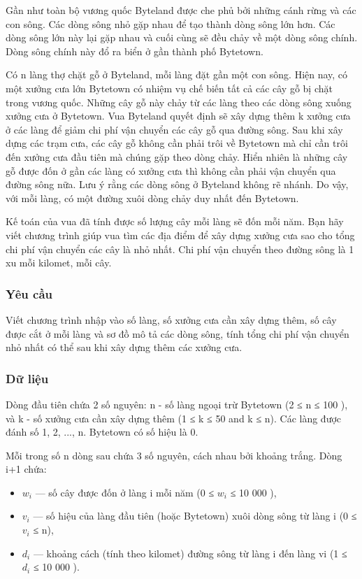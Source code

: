 



   Gần như toàn bộ vương quốc Byteland được che phủ bởi những cánh rừng và các con sông. Các dòng sông nhỏ gặp nhau để tạo thành dòng sông lớn hơn. Các dòng sông lớn này lại gặp nhau và cuối cùng sẽ đều chảy về một dòng sông chính. Dòng sông chính này đổ ra biển ở gần thành phố Bytetown.  

   Có n làng thợ chặt gỗ ở Byteland, mỗi làng đặt gần một con sông. Hiện nay, có một xưởng cưa lớn Bytetown có nhiệm vụ chế biến tất cả các cây gỗ bị chặt trong vương quốc. Những cây gỗ này chảy từ các làng theo các dòng sông xuống xưởng cưa ở Bytetown. Vua Byteland quyết định sẽ xây dựng thêm k xưởng cưa ở các làng để giảm chi phí vận chuyển các cây gỗ qua đường sông. Sau khi xây dựng các trạm cưa, các cây gỗ không cần phải trôi về Bytetown mà chỉ cần trôi đến xưởng cưa đầu tiên mà chúng gặp theo dòng chảy. Hiển nhiên là những cây gỗ được đốn ở gần các làng có xưởng cưa thì không cần phải vận chuyển qua đường sông nữa. Lưu ý rằng các dòng sông ở Byteland không rẽ nhánh. Do vậy, với mỗi làng, có một đường xuôi dòng chảy duy nhất đến Bytetown.  

   Kế toán của vua đã tính được số lượng cây mỗi làng sẽ đốn mỗi năm. Bạn hãy viết chương trình giúp vua tìm các địa điểm để xây dựng xưởng cưa sao cho tổng chi phí vận chuyển các cây là nhỏ nhất. Chi phí vận chuyển theo đường sông là 1 xu mỗi kilomet, mỗi cây.  

\subsubsection{   Yêu cầu  }

   Viết chương trình nhập vào số làng, số xưởng cưa cần xây dựng thêm, số cây được cắt ở mỗi làng và sơ đồ mô tả các dòng sông, tính tổng chi phí vận chuyển nhỏ nhất có thể sau khi xây dựng thêm các xưởng cưa.  

\subsubsection{   Dữ liệu  }

   Dòng đầu tiên chứa 2 số nguyên: n - số làng ngoại trừ Bytetown (2 ≤ n ≤ 100 ), và k - số xưởng cưa cần xây dựng thêm (1 ≤ k ≤ 50 and k ≤ n). Các làng được đánh số 1, 2, ..., n. Bytetown có số hiệu là 0.  

   Mỗi trong số n dòng sau chứa 3 số nguyên, cách nhau bởi khoảng trắng. Dòng i+1 chứa:  
\begin{itemize}
	\item     $w_{i}$    — số cây được đốn ở làng i mỗi năm (0 ≤ $w_{i}$    ≤ 10 000 ),   
	\item     $v_{i}$    — số hiệu của làng đầu tiên (hoặc Bytetown) xuôi dòng sông từ làng i (0 ≤ $v_{i}$    ≤ n),   
	\item     $d_{i}$    — khoảng cách (tính theo kilomet) đường sông từ làng i đến làng vi (1 ≤ $d_{i}$    ≤ 10 000 ).   
\end{itemize}

